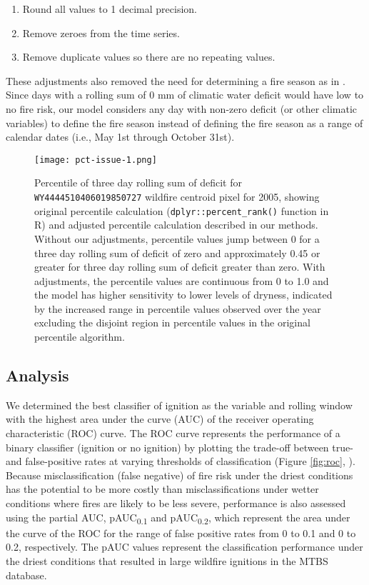 \documentclass[11p]{article}
\newcommand{\pauc}[1]{pAUC\textsubscript{#1}}
\begin{document}
\begin{enumerate}
\item Round all values to 1 decimal precision.
\item Remove zeroes from the time series.
\item Remove duplicate values so there are no repeating values.
\end{enumerate}
   
These adjustments %
also removed the need for determining a fire season as in \citet{thomaWaterBalanceIndicator2020}. Since days with a rolling sum of 0 mm of climatic water deficit would have low to no fire risk, our model considers any day with non-zero deficit (or other climatic variables) to define the fire season instead of defining the fire season as a range of calendar dates (i.e., May 1st through October 31st).

\begin{figure}[htbp]
  \centering
  \texttt{[image: pct-issue-1.png]}
  \caption{Percentile of three day rolling sum of deficit for \texttt{WY4444510406019850727} wildfire centroid pixel for 2005, showing original percentile calculation (\texttt{dplyr::percent\_rank()} function in R) and adjusted percentile calculation described in our methods. Without our adjustments, percentile values jump between 0 for a three day rolling sum of deficit of zero and approximately 0.45 or greater for three day rolling sum of deficit greater than zero. With adjustments, the percentile values are continuous from 0 to 1.0 and the model has higher sensitivity to lower levels of dryness, indicated by the increased range in percentile values observed over the year excluding the disjoint region in percentile values in the original percentile algorithm.}
  \label{fig:pct-issue}
\end{figure}

\subsection{Analysis}

We determined the best classifier of ignition as the variable and rolling window with the highest area under the curve (AUC) of the receiver operating characteristic (ROC) curve. The ROC curve represents the performance of a binary classifier (ignition or no ignition) by plotting the trade-off between true- and false-positive rates at varying thresholds of classification (Figure \ref{fig:roc}, \citet{pontiusRecommendationsUsingRelative2014}). Because misclassification (false negative) of fire risk under the driest conditions has the potential to be more costly than misclassifications under wetter conditions where fires are likely to be less severe, performance is also assessed using the partial AUC, \pauc{0.1} and \pauc{0.2}, which represent the area under the curve of the ROC for the range of false positive rates from 0 to 0.1 and 0 to 0.2, respectively. The pAUC values represent the classification performance under the driest conditions that resulted in large wildfire ignitions in the MTBS database.
\end{document}
